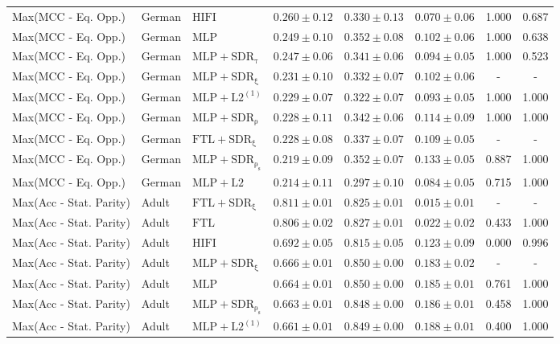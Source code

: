 \begin{table}[htbp]
\begin{tabular}{lllccccc}
Max(MCC - Eq. Opp.) & German & $\mathrm{HIFI}$ & $0.260 \pm0.12$ & $0.330 \pm0.13$ & $0.070 \pm0.06$ & 1.000 & 0.687 \\
Max(MCC - Eq. Opp.) & German & $\mathrm{MLP}$ & $0.249 \pm0.10$ & $0.352 \pm0.08$ & $0.102 \pm0.06$ & 1.000 & 0.638 \\
Max(MCC - Eq. Opp.) & German & $\mathrm{MLP+SDR_{\tau}}$ & $0.247 \pm0.06$ & $0.341 \pm0.06$ & $0.094 \pm0.05$ & 1.000 & 0.523 \\
Max(MCC - Eq. Opp.) & German & $\mathrm{MLP+SDR_{\xi}}$ & $0.231 \pm0.10$ & $0.332 \pm0.07$ & $0.102 \pm0.06$ & - & - \\
Max(MCC - Eq. Opp.) & German & $\mathrm{MLP+L2^{(1)}}$ & $0.229 \pm0.07$ & $0.322 \pm0.07$ & $0.093 \pm0.05$ & 1.000 & 1.000 \\
Max(MCC - Eq. Opp.) & German & $\mathrm{MLP+SDR_{\rho}}$ & $0.228 \pm0.11$ & $0.342 \pm0.06$ & $0.114 \pm0.09$ & 1.000 & 1.000 \\
Max(MCC - Eq. Opp.) & German & $\mathrm{FTL+SDR_{\xi}}$ & $0.228 \pm0.08$ & $0.337 \pm0.07$ & $0.109 \pm0.05$ & - & - \\
Max(MCC - Eq. Opp.) & German & $\mathrm{MLP+SDR_{\rho_s}}$ & $0.219 \pm0.09$ & $0.352 \pm0.07$ & $0.133 \pm0.05$ & 0.887 & 1.000 \\
Max(MCC - Eq. Opp.) & German & $\mathrm{MLP+L2}$ & $0.214 \pm0.11$ & $0.297 \pm0.10$ & $0.084 \pm0.05$ & 0.715 & 1.000 \\
\midrule
Max(Acc - Stat. Parity) & Adult & $\mathrm{FTL+SDR_{\xi}}$ & $0.811 \pm0.01$ & $0.825 \pm0.01$ & $0.015 \pm0.01$ & - & - \\
Max(Acc - Stat. Parity) & Adult & $\mathrm{FTL}$ & $0.806 \pm0.02$ & $0.827 \pm0.01$ & $0.022 \pm0.02$ & 0.433 & 1.000 \\
Max(Acc - Stat. Parity) & Adult & $\mathrm{HIFI}$ & $0.692 \pm0.05$ & $0.815 \pm0.05$ & $0.123 \pm0.09$ & 0.000 & 0.996 \\
Max(Acc - Stat. Parity) & Adult & $\mathrm{MLP+SDR_{\xi}}$ & $0.666 \pm0.01$ & $0.850 \pm0.00$ & $0.183 \pm0.02$ & - & - \\
Max(Acc - Stat. Parity) & Adult & $\mathrm{MLP}$ & $0.664 \pm0.01$ & $0.850 \pm0.00$ & $0.185 \pm0.01$ & 0.761 & 1.000 \\
Max(Acc - Stat. Parity) & Adult & $\mathrm{MLP+SDR_{\rho_s}}$ & $0.663 \pm0.01$ & $0.848 \pm0.00$ & $0.186 \pm0.01$ & 0.458 & 1.000 \\
Max(Acc - Stat. Parity) & Adult & $\mathrm{MLP+L2^{(1)}}$ & $0.661 \pm0.01$ & $0.849 \pm0.00$ & $0.188 \pm0.01$ & 0.400 & 1.000 \\

\end{tabular}
\end{table}

